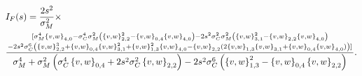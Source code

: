 \documentclass[11pt]{article}
\begin{document}
	\begin{align}
		&I_F(s) = \frac{2s^2}{\sigma_M^2} \times \\
		&  \frac{{[\sigma_M^4 \left\{v,w\right\}_{4,0} - \sigma_C^4 \sigma_M^2 \left(\left\{v, w\right\}_{2,2}^2 - \left\{v, w\right\}_{0,4} \left\{v, w\right\}_{4,0}\right) -2s^2 \sigma_C^2 \sigma_M^2 \left(\left\{v, w\right\}_{3,1}^2 - \left\{v,w\right\}_{2,2} \left\{v,w\right\}_{4,0}\right) \atop - 2s^2 \sigma_C^6 \left(\left\{v,w\right\}_{2,2}^3 + \left\{v, w\right\}_{0,4} \left\{v, w\right\}_{3,1}^2 + \left\{v, w\right\}_{1,3}^2 \left\{v, w\right\}_{4,0} - \left\{v,w\right\}_{2,2} (2 \left\{v, w\right\}_{1,3} \left\{v, w\right\}_{3,1} + \left\{v,w\right\}_{0,4} \left\{v,w\right\}_{4,0}) \right)]}}{\sigma_M^4 + \sigma_M^2\left(\sigma_C^4\left\{v, w\right\}_{0,4} + 2 s^2 \sigma_C^2 \left\{v, w\right\}_{2,2}\right) - 2 s^2 \sigma_C^6 \left(\left\{v,w\right\}_{1,3}^2 - \left\{v, w\right\}_{0,4} \left\{v, w\right\}_{2,2}\right)}.
	\end{align}
	\newpage
%	
\end{document}
